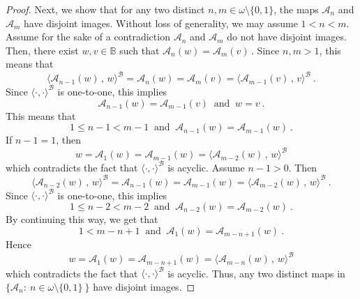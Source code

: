 \documentclass[10pt,a4paper, openany,  oldfontcommands]{memoir}
\newtheorem{open problem} [theorem] {Open Problem}
\newtheorem{open question} [theorem] {Open Question}
\begin{document}
\begin{proof}
Next, we show that  for any two distinct  $  n, m  \in     \omega  \setminus  \lbrace  0, 1   \rbrace  $, 
the maps $    \mathcal{A}_n   $  and  $   \mathcal{A}_m $  have disjoint images. 
Without loss of generality, we may assume  $ 1 <   n <  m  $. 
Assume for the sake of a contradiction $    \mathcal{A}_n   $  and  $   \mathcal{A}_m $  do not have disjoint images. 
Then, there exist  $  w,  v  \in  \mathbb{B}  $  such that  
$     \mathcal{A}_{n}  \left(  w  \right)     =  \mathcal{A}_{m}  \left(  v  \right)     \,   $. 
Since   $  n,m >  1  $, this means that 
\[
\langle    \mathcal{A}_{n-1}  \left(  w  \right)   \,   ,  \,  w   \rangle^{   \mathcal{B} } 
  =   \mathcal{A}_{n}  \left(  w  \right)    
 =  \mathcal{A}_{m}  \left(  v  \right) 
 = 
 \langle    \mathcal{A}_{m-1}  \left(  v  \right)   \,   ,  \,  v   \rangle^{   \mathcal{B} } 
\    .
\]
Since  $  \langle  \cdot  ,  \cdot  \rangle^{  \mathcal{B} }  $  is one-to-one,  this implies    
\[
\mathcal{A}_{n-1}  \left(  w  \right)    =     \mathcal{A}_{m-1}  \left(  v  \right)    
\   \mbox{  and  }     \     w  =  v  
\      .
\]
This means that  
\[
 1  \leq  n-1   <  m-1  
 \   \mbox{  and  }    \       \mathcal{A}_{n-1}  \left(  w  \right)     =  \mathcal{A}_{m-1}  \left(  w  \right)    
 \      .
\]
If  $  n-1 =  1  $,  then  
\[
w  =   \mathcal{A}_{1}  \left(  w  \right)     =  \mathcal{A}_{m-1}  \left(  w  \right)     =
  \langle    \mathcal{A}_{m-2}  \left(  w  \right)    \,  ,  \,  w  \rangle^{  \mathcal{B} }
\]
which contradicts the fact that  $   \langle  \cdot ,  \cdot   \rangle^{  \mathcal{B}  }  $  is acyclic. 
Assume $  n-1  >  0  $.   Then 
\[
  \langle    \mathcal{A}_{n-2}  \left(  w  \right)    \,  ,  \,  w  \rangle^{  \mathcal{B} }
  =  
 \mathcal{A}_{n-1}  \left(  w  \right)     =  \mathcal{A}_{m-1}  \left(  w  \right)    
 = 
   \langle    \mathcal{A}_{m-2}  \left(  w  \right)    \,  ,  \,  w  \rangle^{  \mathcal{B} }
\       .
\]
Since    $  \langle  \cdot  ,  \cdot  \rangle^{  \mathcal{B} }  $  is one-to-one,  this implies    
\[
 1  \leq  n-2   <  m-2  
 \   \mbox{  and  }    \       \mathcal{A}_{n-2}  \left(  w  \right)     =  \mathcal{A}_{m-2}  \left(  w  \right)    
 \      .
\]
By continuing this way, we get that 
\[
1  <  m -n+1   
 \   \mbox{  and  }    \       \mathcal{A}_{1}  \left(  w  \right)     =  \mathcal{A}_{m-n+1}  \left(  w  \right)    
 \      .
\]
Hence
\[
w  =   \mathcal{A}_{1}  \left(  w  \right)        =   \mathcal{A}_{m-n+1}  \left(  w  \right)     = 
    \langle    \mathcal{A}_{m-n}  \left(  w  \right)    \,  ,  \,  w  \rangle^{  \mathcal{B} } 
\]
which contradicts the fact that  $   \langle  \cdot ,  \cdot   \rangle^{  \mathcal{B}  }  $  is acyclic. 
Thus, any two distinct maps in  $  \lbrace  \mathcal{A}_{n}  :   \   n  \in  \omega  \setminus  \lbrace 0, 1  \rbrace    \  \rbrace $  
have disjoint images. 
  








\end{proof}
\end{document}
